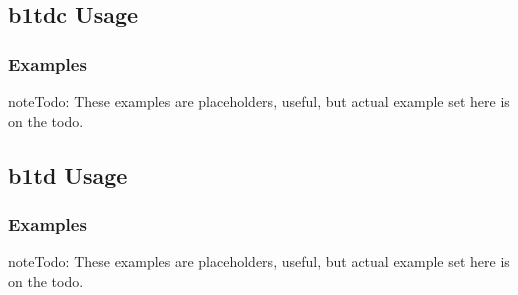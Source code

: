 \documentclass[letterpaper,10pt,english]{sphinxmanual}
\begin{document}
\subsection{b1tdc Usage}
\label{\detokenize{b1tdc-usage:b1tdc-usage}}\label{\detokenize{b1tdc-usage::doc}}

\subsubsection{Examples}
\label{\detokenize{b1tdc-usage:examples}}
\begin{sphinxadmonition}{note}{\label{\detokenize{b1tdc-usage:id1}}Todo:}
\sphinxAtStartPar
These examples are placeholders, useful, but actual example set here is on
the todo.
\end{sphinxadmonition}

\begin{sphinxVerbatim}[commandchars=\\\{\}]
 
  
\end{sphinxVerbatim}


\subsection{b1td Usage}
\label{\detokenize{b1tdep-usage:b1td-usage}}\label{\detokenize{b1tdep-usage::doc}}

\subsubsection{Examples}
\label{\detokenize{b1tdep-usage:examples}}
\begin{sphinxadmonition}{note}{\label{\detokenize{b1tdep-usage:id1}}Todo:}
\sphinxAtStartPar
These examples are placeholders, useful, but actual example set here is on
the todo.
\end{sphinxadmonition}
\end{document}
